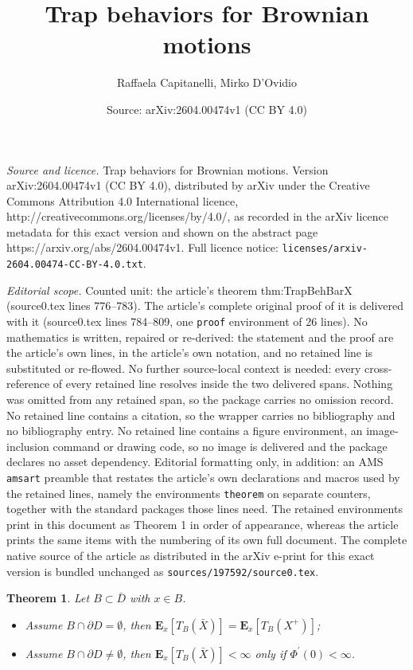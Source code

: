 \documentclass[10pt,a4paper]{amsart}
\title{Trap behaviors for Brownian motions}
\author{Raffaela Capitanelli, Mirko D'Ovidio}
\date{Source: arXiv:2604.00474v1 (CC BY 4.0)}
\newtheorem{theorem}{Theorem}
\begin{document}
\maketitle

\noindent\emph{Source and licence.} Trap behaviors for Brownian motions. Version arXiv:2604.00474v1 (CC BY 4.0), distributed by arXiv under the Creative Commons Attribution 4.0 International licence, http://creativecommons.org/licenses/by/4.0/, as recorded in the arXiv licence metadata for this exact version and shown on the abstract page https://arxiv.org/abs/2604.00474v1. Full licence notice: \texttt{licenses/arxiv-2604.00474-CC-BY-4.0.txt}.\par\smallskip

\noindent\textit{Editorial scope.} Counted unit: the article's theorem thm:TrapBehBarX (source0.tex lines 776--783). The article's complete original proof of it is delivered with it (source0.tex lines 784--809, one \texttt{proof} environment of 26 lines). No mathematics is written, repaired or re-derived: the statement and the proof are the article's own lines, in the article's own notation, and no retained line is substituted or re-flowed.  No further source-local context is needed: every cross-reference of every retained line resolves inside the two delivered spans.  Nothing was omitted from any retained span, so the package carries no omission record.  No retained line contains a citation, so the wrapper carries no bibliography and no bibliography entry.  No retained line contains a figure environment, an image-inclusion command or drawing code, so no image is delivered and the package declares no asset dependency.  Editorial formatting only, in addition: an AMS \texttt{amsart} preamble that restates the article's own declarations and macros used by the retained lines, namely the environments \texttt{theorem} on separate counters, together with the standard packages those lines need.  The retained environments print in this document as Theorem 1 in order of appearance, whereas the article prints the same items with the numbering of its own full document.  The complete native source of the article as distributed in the arXiv e-print for this exact version is bundled unchanged as \texttt{sources/197592/source0.tex}.
\begin{theorem}
Let $B \subset \bar{D}$ with $x \in B$.
\begin{itemize}
\item[i)] Assume $B \cap \partial D = \emptyset$, then $\mathbf{E}_x[T_B(\bar{X})] = \mathbf{E}_x[T_B(X^+)]$;
\item[ii)] Assume $B \cap \partial D \neq \emptyset$, then $\mathbf{E}_x[T_B(\bar{X})] < \infty$ only if $\Phi^\prime(0)< \infty$.
\end{itemize}
\label{thm:TrapBehBarX}
\end{theorem}
\end{document}
